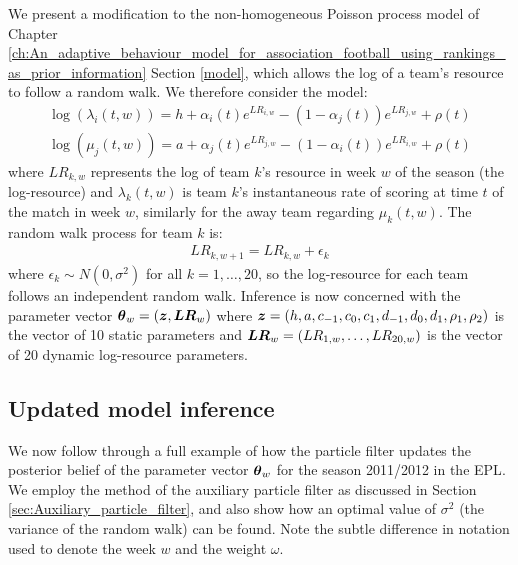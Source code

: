 We present a modification to the non-homogeneous Poisson process model of Chapter
\ref{ch:An_adaptive_behaviour_model_for_association_football_using_rankings_as_prior_information} Section \ref{model},
which allows the log of a team's resource to follow a random walk. We therefore consider the model:
\begin{align}
  \log(\lambda_{i}(t, w)) = h + \alpha_i(t) e^{LR_{i, w}} - (1 - \alpha_j(t)) e^{LR_{j, w}} + \rho(t)
  \label{eq:dynamicHomeRate}\\
  \log(\mu_{j}(t, w)) = a + \alpha_j(t) e^{LR_{j, w}} - (1 - \alpha_i(t)) e^{LR_{i, w}} + \rho(t)
  \label{eq:dynamicAwayRate}
\end{align} 
where \(LR_{k, w}\) represents the log of team \(k\)'s resource in week \(w\) of the season (the log-resource) and
\(\lambda_{k}(t, w)\) is team \(k\)'s instantaneous rate of scoring at time \(t\) of the match in week \(w\), similarly
for the away team regarding \(\mu_{k}(t, w)\). The random walk process for team \(k\) is:
\begin{align}
LR_{k, w+1} = LR_{k, w} + \epsilon_k 
\label{eq:randomWalk}
\end{align}
where \(\epsilon_k \sim N(0, \sigma^2)\) for all \(k = 1, \ldots, 20\), so the log-resource for each team follows an
independent random walk. Inference is now concerned with the parameter vector \(\boldsymbol{\theta}_w = (\boldsymbol{z}, \boldsymbol{LR}_w)\)
where \(\boldsymbol{z} = (h, a, c_{-1}, c_{0}, c_{1}, d_{-1}, d_{0}, d_{1}, \rho_1, \rho_2)\) is the vector of 10 static
parameters and \(\boldsymbol{LR}_w = (LR_{1, w}, \ldots, LR_{20, w})\) is the vector of 20 dynamic log-resource parameters.

\subsection{Updated model inference}
\label{sec:Updated_model_inference}

We now follow through a full example of how the particle filter updates the posterior belief of the parameter vector
\(\boldsymbol{\theta}_w\) for the season 2011/2012 in the \gls{EPL}. We employ the method of the auxiliary particle filter as
discussed in Section \ref{sec:Auxiliary_particle_filter}, and also show how an optimal value of \(\sigma^2\) (the
variance of the random walk) can be found. Note the subtle difference in notation used to denote the week \(w\) and the
weight \(\omega\).

